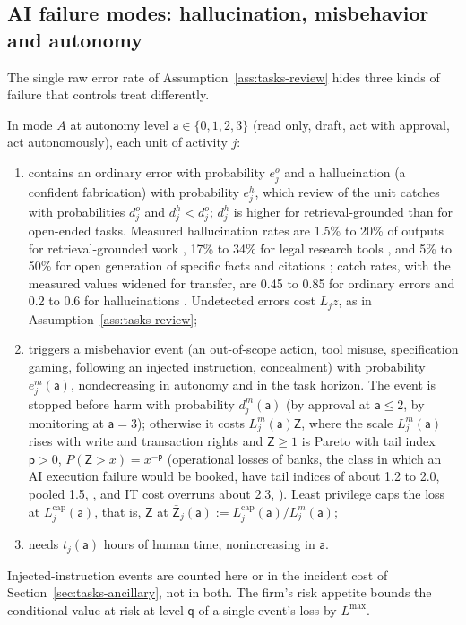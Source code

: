 \subsection{AI failure modes: hallucination, misbehavior and autonomy}\label{sec:tasks-failure}

The single raw error rate of Assumption~\ref{ass:tasks-review} hides three kinds of failure that controls treat differently.

\begin{assumption}\label{ass:tasks-failure}
In mode $A$ at autonomy level $\mathsf a\in\{0,1,2,3\}$ (read only, draft, act with approval, act autonomously), each unit of activity $j$:
\begin{enumerate}
\item[(i)] contains an ordinary error with probability $e^o_j$ and a hallucination (a confident fabrication) with probability $e^h_j$, which review of the unit catches with probabilities $d^o_j$ and $d^h_j<d^o_j$; $d^h_j$ is higher for retrieval-grounded than for open-ended tasks. Measured hallucination rates are 1.5\% to 20\% of outputs for retrieval-grounded work \citep{asgari2025framework,vectara2026hallucination}, 17\% to 34\% for legal research tools \citep{magesh2025hallucination}, and 5\% to 50\% for open generation of specific facts and citations \citep{walters2023fabrication,dahl2024large,openai2025o3}; catch rates, with the measured values widened for transfer, are 0.45 to 0.85 for ordinary errors and 0.2 to 0.6 for hallucinations \citep{panko1999applying,si2024large,dratsch2023automation}. Undetected errors cost $L_jz$, as in Assumption~\ref{ass:tasks-review};
\item[(ii)] triggers a misbehavior event (an out-of-scope action, tool misuse, specification gaming, following an injected instruction, concealment) with probability $e^m_j(\mathsf a)$, nondecreasing in autonomy and in the task horizon. The event is stopped before harm with probability $d^m_j(\mathsf a)$ (by approval at $\mathsf a\le 2$, by monitoring at $\mathsf a=3$); otherwise it costs $L^m_j(\mathsf a)\mathsf Z$, where the scale $L^m_j(\mathsf a)$ rises with write and transaction rights and $\mathsf Z\ge 1$ is Pareto with tail index $\mathsf p>0$, $P(\mathsf Z>x)=x^{-\mathsf p}$ (operational losses of banks, the class in which an AI execution failure would be booked, have tail indices of about 1.2 to 2.0, pooled 1.5, \citealp{defontnouvelle2007implications}, and IT cost overruns about 2.3, \citealp{flyvbjerg2022empirical}). Least privilege caps the loss at $L^{\mathrm{cap}}_j(\mathsf a)$, that is, $\mathsf Z$ at $\bar{\mathsf Z}_j(\mathsf a):=L^{\mathrm{cap}}_j(\mathsf a)/L^m_j(\mathsf a)$;
\item[(iii)] needs $t_j(\mathsf a)$ hours of human time, nonincreasing in $\mathsf a$.
\end{enumerate}
Injected-instruction events are counted here or in the incident cost of Section~\ref{sec:tasks-ancillary}, not in both. The firm's risk appetite bounds the conditional value at risk at level $\mathsf q$ of a single event's loss by $L^{\max}$.
\end{assumption}

